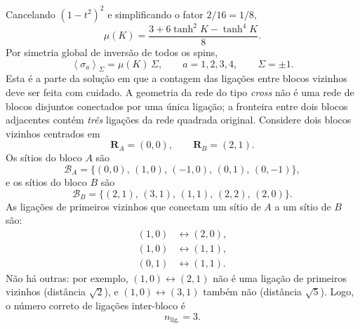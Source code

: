 \documentclass[12pt,a4paper]{article}
\begin{document}
%
Cancelando \((1-t^2)^2\) e simplificando o fator \(2/16=1/8\),
%
\begin{equation}
    \boxed{
    \mu(K)
    =
    \frac{
        3+6\tanh^2 K-\tanh^4 K
    }{8}.
    }
    \label{eq:mu_p3}
\end{equation}
%
Por simetria global de inversão de todos os spins,
%
\begin{equation}
    \left\langle
        \sigma_a
    \right\rangle_{\Sigma}
    =
    \mu(K)\,\Sigma,
    \qquad
    a=1,2,3,4,
    \qquad
    \Sigma=\pm1.
    \label{eq:sigma_mu_p3}
\end{equation}
% 
Esta é a parte da solução em que a contagem das ligações entre
blocos vizinhos deve ser feita com cuidado. A geometria da rede do
tipo \emph{cross} não é uma rede de blocos disjuntos conectados por
uma única ligação; a fronteira entre dois blocos adjacentes contém
\emph{três} ligações da rede quadrada original. Considere dois blocos vizinhos centrados em
%
\begin{equation}
    \mathbf R_A=(0,0),
    \qquad
    \mathbf R_B=(2,1).
\end{equation}
%
Os sítios do bloco \(A\) são
%
\begin{equation}
    \mathcal B_A
    =
    \{(0,0),\,(1,0),\,(-1,0),\,(0,1),\,(0,-1)\},
\end{equation}
%
e os sítios do bloco \(B\) são
%
\begin{equation}
    \mathcal B_B
    =
    \{(2,1),\,(3,1),\,(1,1),\,(2,2),\,(2,0)\}.
\end{equation}
%
As ligações de primeiros vizinhos que conectam um sítio de \(A\) a
um sítio de \(B\) são:
%
\begin{align}
    (1,0)&\longleftrightarrow(2,0),
    \label{eq:bond1_p3}
    \\[2pt]
    (1,0)&\longleftrightarrow(1,1),
    \label{eq:bond2_p3}
    \\[2pt]
    (0,1)&\longleftrightarrow(1,1).
    \label{eq:bond3_p3}
\end{align}
%
Não há outras: por exemplo, \((1,0)\leftrightarrow(2,1)\) não é uma
ligação de primeiros vizinhos (distância \(\sqrt2\)), e
\((1,0)\leftrightarrow(3,1)\) também não (distância \(\sqrt5\)).
Logo, o número correto de ligações inter-bloco é
%
\begin{equation}
    n_{\text{lig.}}=3.
    \label{eq:n_lig_p3}
\end{equation}
\end{document}

